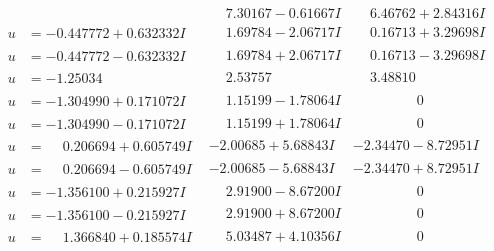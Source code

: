 \documentclass[1p]{elsarticle_modified}
\theoremstyle{definition}
\begin{document}
$$\begin{array}{c|c|c}
 & \phantom{-}7.30167 - 0.61667 I & \phantom{-}6.46762 + 2.84316 I \\ \hline\begin{aligned}
u &= -0.447772 + 0.632332 I\end{aligned}
 & \phantom{-}1.69784 - 2.06717 I & \phantom{-}0.16713 + 3.29698 I \\ \hline\begin{aligned}
u &= -0.447772 - 0.632332 I\end{aligned}
 & \phantom{-}1.69784 + 2.06717 I & \phantom{-}0.16713 - 3.29698 I \\ \hline\begin{aligned}
u &= -1.25034\phantom{ +0.000000I}\end{aligned}
 & \phantom{-}2.53757\phantom{ +0.000000I} & \phantom{-}3.48810\phantom{ +0.000000I} \\ \hline\begin{aligned}
u &= -1.304990 + 0.171072 I\end{aligned}
 & \phantom{-}1.15199 - 1.78064 I & \phantom{-0.000000 } 0 \\ \hline\begin{aligned}
u &= -1.304990 - 0.171072 I\end{aligned}
 & \phantom{-}1.15199 + 1.78064 I & \phantom{-0.000000 } 0 \\ \hline\begin{aligned}
u &= \phantom{-}0.206694 + 0.605749 I\end{aligned}
 & -2.00685 + 5.68843 I & -2.34470 - 8.72951 I \\ \hline\begin{aligned}
u &= \phantom{-}0.206694 - 0.605749 I\end{aligned}
 & -2.00685 - 5.68843 I & -2.34470 + 8.72951 I \\ \hline\begin{aligned}
u &= -1.356100 + 0.215927 I\end{aligned}
 & \phantom{-}2.91900 - 8.67200 I & \phantom{-0.000000 } 0 \\ \hline\begin{aligned}
u &= -1.356100 - 0.215927 I\end{aligned}
 & \phantom{-}2.91900 + 8.67200 I & \phantom{-0.000000 } 0 \\ \hline\begin{aligned}
u &= \phantom{-}1.366840 + 0.185574 I\end{aligned}
 & \phantom{-}5.03487 + 4.10356 I & \phantom{-0.000000 } 0 \\ \hline\begin{aligned}

\end{aligned}
\end{array}$$
\end{document}
